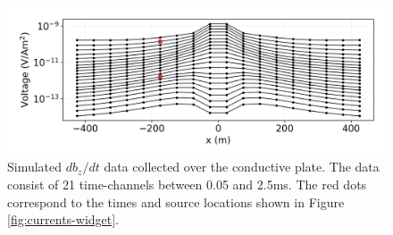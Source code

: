 \begin{figure}
    \begin{center}
    \includegraphics[width=\columnwidth]{figures/aem-data.png}
    \end{center}
\caption{
    Simulated $db_z/dt$ data collected over the conductive plate. The data consist of 21 time-channels between 0.05 and 2.5ms. The red dots correspond to the times and source locations shown in Figure \ref{fig:currents-widget}.
}
\label{fig:aem-data}
\end{figure}

